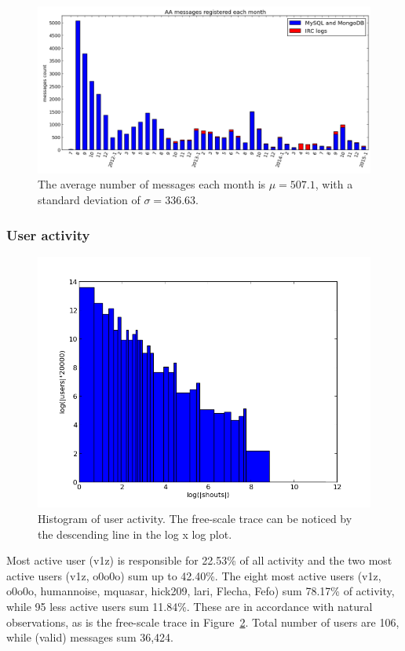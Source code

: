 \documentclass[a4paper, 11pt]{article} %
\begin{document}
\begin{figure}[H]
    \hspace{-25mm}
    \includegraphics[width=1.3\textwidth]{imgs/actHist}
  \caption{\small The average number of messages each month is $\mu=507.1$, with a standard deviation of $\sigma=336.63 $.}\label{fig:mAct}
\end{figure}

\subsubsection{User activity}
\begin{figure}[H]
    \hspace{-25mm}
    \includegraphics[width=1.3\textwidth]{imgs/userHist}
  \caption{\small Histogram of user activity. The free-scale trace can be noticed by the descending line in the log x log plot.}\label{fig:uH}
\end{figure}

Most active user (v1z) is responsible for 22.53\% of all activity and the two most active users (v1z, o0o0o) sum up to 42.40\%. The eight most active users (v1z, o0o0o, humannoise, mquasar, hick209, lari, Flecha, Fefo) sum 78.17\% of activity, while 95 less active users sum 11.84\%. These are in accordance with natural observations, as is the free-scale trace in Figure~\ref{fig:uH}. Total number of users are 106, while (valid) messages sum 36,424.
\end{document}
